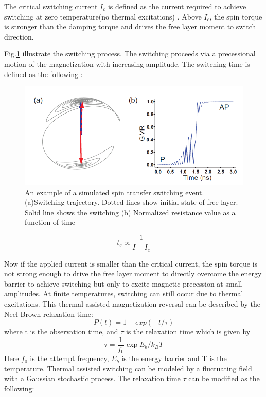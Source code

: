 The critical switching current $I_c$ is defined as the current required to achieve switching at zero temperature(no thermal excitations)  . Above $I_c$, the spin torque is stronger than the damping torque and drives the free layer moment to switch direction.

Fig.\ref{fig:Switching} illustrate the switching process. The switching proceeds via a precessional motion of the magnetization with increasing amplitude\cite{subswitch}. The switching time is defined as the following :


\begin{figure}[!ht]
\centering
	\includegraphics[width=1.0\textwidth]{fig/switching.PNG}
	\caption{An example of a simulated spin transfer switching event.(a)Switching trajectory. Dotted lines show initial state of free layer. Solid line shows the switching (b) Normalized resistance value as a function of time}
	\label{fig:Switching}
\end{figure}

\begin{equation}
t_s \propto \frac{1}{I-I_c}
\end{equation}

Now if the applied current is smaller than the critical current, the spin torque is not strong enough to drive the free layer moment to directly overcome the energy barrier to achieve switching but only to excite magnetic precession at small amplitudes. At finite temperatures, switching can still occur due to thermal excitations. This thermal-assisted magnetization reversal can be described by the Neel-Brown relaxation time:
\begin{equation}
P(t) = 1 - exp(-t/\tau)
\end{equation}
where t is the observation time, and $\tau$ is the relaxation time which is given by
\begin{equation}
\tau = \frac{1}{f_0}\exp{E_b/k_B T}
\end{equation}
Here $f_0$ is the attempt frequency, $E_b$ is the energy barrier and T is the temperature. Thermal assisted switching can be modeled by a fluctuating field with a Gaussian stochastic process. The relaxation time $\tau$ can be modified as the following:

